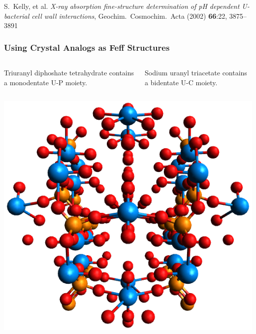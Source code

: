 \documentclass[10pt, xcolor=x11names, compress]{beamer}
\begin{document}
\begin{frame}
  \begin{flushright}
    \begin{minipage}{0.5\linewidth}
      \tiny
      S.\ Kelly, et al. \textit{X-ray absorption fine-structure
        determination of pH dependent U-bacterial cell wall
        interactions}, Geochim.\ Cosmochim.\ Acta (2002)
      \textbf{66}:22, 3875--3891
    \end{minipage}
  \end{flushright}
\end{frame}

\begin{frame}
  \frametitle{Using Crystal Analogs as Feff Structures}
  \small
  \begin{columns}[T]
    \begin{column}{0.5\linewidth}
      Triuranyl diphoshate tetrahydrate contains a monodentate U-P moiety.
    \end{column}
    \begin{column}{0.5\linewidth}
      Sodium uranyl triacetate contains a bidentate U-C moiety.
    \end{column}
  \end{columns}

  \smallskip

  \begin{columns}[T]
    \begin{column}{0.5\linewidth}
      \begin{center}
        \includegraphics[width=0.4\linewidth]{mfc/upo4.png}


\end{center}
\end{column}
\end{columns}
\end{frame}
\end{document}
